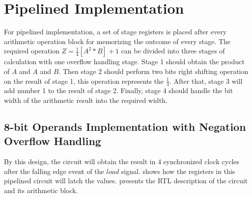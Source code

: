 \section{Pipelined Implementation}

For pipelined implementation, a set of stage registers is placed after every arithmetic operation block for memorizing the outcome of every stage.
The required operation \textbf{\(Z = \frac{1}{4} [A^2\ast B] + 1\)} can be divided into three stages of calculation with one overflow handling stage.
Stage 1 should obtain the product of \(A\) and \(A\) and \(B\).
Then stage 2 should perform two bits right shifting operation on the result of stage 1, this operation represents the \(\frac{1}{4}\).
After that, stage 3 will add number 1 to the result of stage 2.
Finally, stage 4 should handle the bit width of the arithmetic result into the required width.

\subsection{8-bit Operands Implementation with Negation Overflow Handling}

By this design, the circuit will obtain the result in 4 synchronized clock cycles after the falling edge event of the \(load\) signal.
 shows how the registers in this pipelined circuit will latch the values.
 presents the RTL description of the circuit and its arithmetic block.

